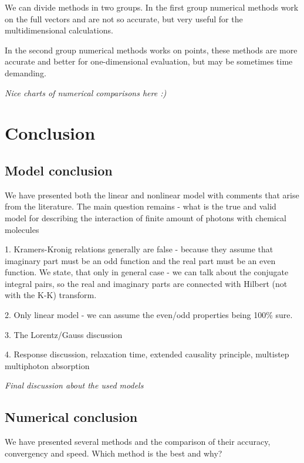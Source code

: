 \documentclass[12pt,twoside,a4paper]{article}
\def\emptyline{\vspace{12pt}}
\numberwithin{equation}{subsection}
\numberwithin{figure}{subsection}
\begin{document}
We can divide methods in two groups.  In the first group numerical methods work on the full vectors and are
not so accurate, but very useful for the multidimensional calculations.

In the second group numerical methods works on points, these methods are more accurate and better for one-dimensional evaluation,
but may be sometimes time demanding.

\textit{Nice charts of numerical comparisons here :)}

\section{Conclusion} \label{chap:conclusion}

\subsection{Model conclusion} \label{chap:conclusion_model}

We have presented both the linear and nonlinear model with comments that arise from the literature. The main question remains -
what is the true and valid model for describing the interaction of finite amount of photons with chemical molecules

\emptyline

1. Kramers-Kronig relations generally are false - because they assume that imaginary part must be an odd function and the real
part must be an even function. We state, that only in general case - we can talk about the conjugate integral pairs, so the real
and imaginary parts are connected with Hilbert (not with the K-K) transform.

\emptyline

2. Only linear model - we can assume the even/odd properties being 100\% sure.

\emptyline

3. The Lorentz/Gauss discussion

\emptyline

4. Response discussion, relaxation time, extended causality principle, multistep multiphoton absorption

\textit{Final discussion about the used models}

\subsection{Numerical conclusion} \label{chap:conclusion_numerical}

We have presented several methods and the comparison of their accuracy, convergency and speed. Which method is the best and why?
\end{document}
